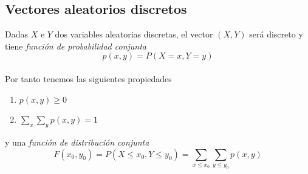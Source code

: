 \subsection{Vectores aleatorios discretos}

Dadas \(X\) e \(Y\) dos variables aleatorias discretas, el vector \((X, Y)\) será 
discreto y tiene \textit{función de probabilidad conjunta} 
\[p(x, y) = P(X = x, Y = y)\] \\
Por tanto tenemos las siguientes propiedades
\begin{enumerate}
    \item \(p(x, y) \geq 0\)
    \item \(\sum_{x}\sum_{y} p(x, y) = 1\)
\end{enumerate}
y una \textit{función de distribución conjunta}
\[F(x_{0}, y_{0}) = P(X \leq x_0, Y \leq y_0) = \sum_{x \leq x_0} \sum_{y \leq y_0} p(x, y)\]

\newpage

